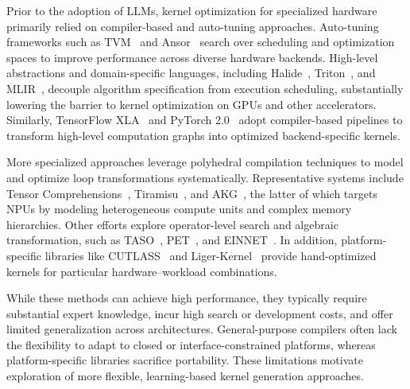 
Prior to the adoption of LLMs, kernel optimization for specialized hardware primarily relied on compiler-based and auto-tuning approaches. Auto-tuning frameworks such as TVM~\cite{chen2018tvm} and Ansor~\cite{zheng2020ansor} search over scheduling and optimization spaces to improve performance across diverse hardware backends. High-level abstractions and domain-specific languages, including Halide~\cite{ragan2013halide}, Triton~\cite{tillet2019triton}, and MLIR~\cite{lattner2020mlir}, decouple algorithm specification from execution scheduling, substantially lowering the barrier to kernel optimization on GPUs and other accelerators. Similarly, TensorFlow XLA~\cite{snider2023operator} and PyTorch 2.0~\cite{ansel2024pytorch} adopt compiler-based pipelines to transform high-level computation graphs into optimized backend-specific kernels.

More specialized approaches leverage polyhedral compilation techniques to model and optimize loop transformations systematically. Representative systems include Tensor Comprehensions~\cite{vasilache2018tensor}, Tiramisu~\cite{baghdadi2019tiramisu}, and AKG~\cite{zhao2021akg}, the latter of which targets NPUs by modeling heterogeneous compute units and complex memory hierarchies. Other efforts explore operator-level search and algebraic transformation, such as TASO~\cite{jia2019taso}, PET~\cite{wang2021pet}, and EINNET~\cite{zheng2023einnet}. In addition, platform-specific libraries like CUTLASS~\cite{markidis2018nvidia} and Liger-Kernel~\cite{hsu2024liger} provide hand-optimized kernels for particular hardware–workload combinations.

While these methods can achieve high performance, they typically require substantial expert knowledge, incur high search or development costs, and offer limited generalization across architectures. General-purpose compilers often lack the flexibility to adapt to closed or interface-constrained platforms, whereas platform-specific libraries sacrifice portability. These limitations motivate exploration of more flexible, learning-based kernel generation approaches.


